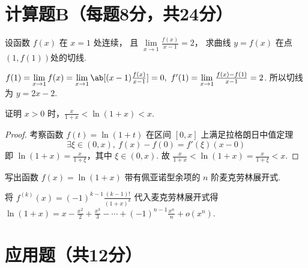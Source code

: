 \section{计算题B（每题8分，共24分）}

\begin{problem}
  设函数 $f(x)$ 在 $x = 1$ 处连续，
  且 $\lim\limits_{x \to 1} \frac{f(x)}{x - 1} = 2$，
  求曲线 $y = f(x)$ 在点 $(1,f(1))$处的切线.
\end{problem}
\scratch
\begin{solution}
  $f(1) = \lim\limits_{x \to 1} f(x)
        = \lim\limits_{x \to 1} \ab[(x - 1)\frac{f(x)}{x - 1}] = 0,~
   f'(1)= \lim\limits_{x \to 1} \frac{f(x) - f(1)}{x - 1} = 2$.
  所以切线为 $y = 2x - 2$.
\end{solution}

\begin{problem}
  证明 $x > 0$ 时，$\frac{x}{1 + x} < \ln(1 + x) < x$.
\end{problem}
\scratch
\begin{solution}
  \begin{proof}
    考察函数 $f(t) = \ln (1 + t)$ 在区间 $[0,x]$ 上满足拉格朗日中值定理
    \[\exists \xi \in (0,x),~ f(x) - f(0) = f'(\xi)(x - 0)\]
    即 $\ln(1 + x) = \frac{x}{1 + \xi}$，其中 $\xi \in (0,x)$. 故
    $\frac{x}{1 + x} < \ln(1 + x) = \frac{x}{1 + \xi} < x$.
  \end{proof}
\end{solution}

\begin{problem}
  写出函数 $f(x) = \ln(1 + x)$ 带有佩亚诺型余项的 $n$ 阶麦克劳林展开式.
\end{problem}
\scratch
\begin{solution}
  将 $f^{(k)}(x) = (-1)^{k - 1} \frac{(k - 1)!}{(1 + x)^k}$ 代入麦克劳林展开式得
  $ \ln (1 + x) = x - \frac{x^2}{2} + \frac{x^3}{3} - \cdots
  + (-1)^{n - 1}\frac{x^n}{n} + o(x^n)$.
\end{solution}

\section{应用题（共12分）}

